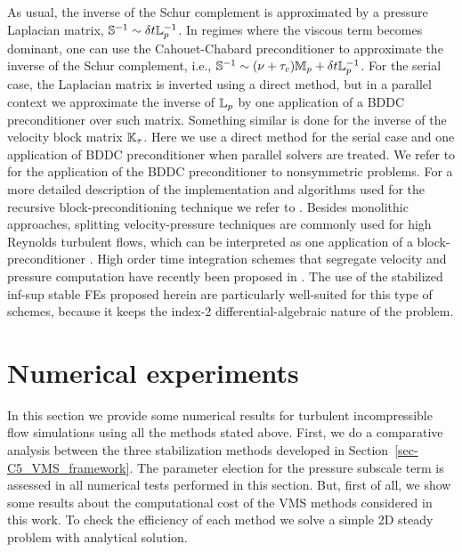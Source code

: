 As usual, the inverse of the Schur complement is approximated by a pressure Laplacian matrix, $\mathbb{S}^{-1}\sim \delta t \mathbb{L}_p^{-1}$. In regimes where the viscous term becomes dominant, one can use the Cahouet-Chabard preconditioner to approximate the inverse of the Schur complement, i.e., $\mathbb{S}^{-1}\sim (\nu+\tau_c)\mathbb{M}_p + \delta t \mathbb{L}_p^{-1}$. For the serial case, the Laplacian matrix is inverted using a direct method, but in a parallel context we approximate the inverse of $\mathbb{L}_p$ by one application of a BDDC preconditioner over such matrix. Something similar is done for the inverse of the velocity block matrix $\mathbb{K}_\tau$. Here we use a direct method for the serial case and one application of BDDC preconditioner when parallel solvers are treated. We refer to \cite{yano_bddc_2010} for the application of the BDDC preconditioner to nonsymmetric problems. For a more detailed description of the implementation and algorithms used for the recursive block-preconditioning technique we refer to \cite{badia_block_2014}. Besides monolithic approaches, splitting velocity-pressure techniques are commonly used for high Reynolds turbulent flows, which can be interpreted as one application of a block-preconditioner \cite{elman_finite_2005,badia_algebraic_2008}. High order time integration schemes that segregate velocity and pressure computation have recently been proposed in \cite{colomes_segregated_2015}. The use of the stabilized inf-sup stable FEs proposed herein are particularly well-suited for this type of schemes, because it keeps the index-2 differential-algebraic nature of the problem. 

\section{Numerical experiments}
\label{sec-C5_results}
In this section we provide some numerical results for turbulent incompressible flow simulations using all the methods stated above. First, we do a comparative analysis between the three stabilization methods developed in Section~\ref{sec-C5_VMS_framework}. The parameter election for the pressure subscale term is assessed in all numerical tests performed in this section.
But, first of all, we show some results about the computational cost of the VMS methods considered in this work. To check the efficiency of each method we solve a simple 2D steady problem with analytical solution.


